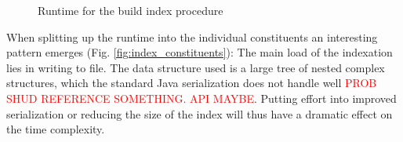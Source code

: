 \documentclass[thesis.tex]{subfiles}
\begin{document}
\begin{figure}[!ht]
    \caption{Runtime for the build index procedure}
    \label{fig:build_index}
\end{figure}
\par\noindent
When splitting up the runtime into the individual constituents an interesting pattern emerges (Fig. \ref{fig:index_constituents}): The main load of the indexation lies in writing to file. The data structure used is a large tree of nested complex structures, which the standard Java serialization does not handle well \textcolor{red}{PROB SHUD REFERENCE SOMETHING. API MAYBE}. Putting effort into improved serialization or reducing the size of the index will thus have a dramatic effect on the time complexity.
\end{document}
